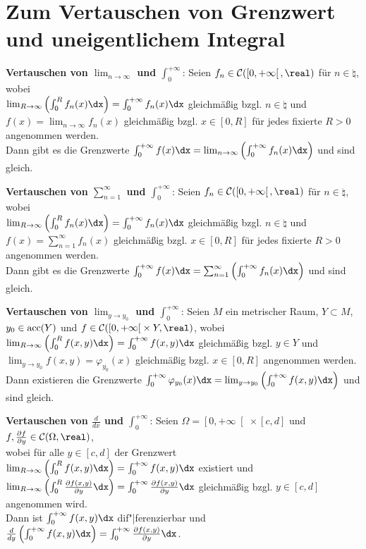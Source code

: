 \section{%
    Zum Vertauschen von Grenzwert und uneigentlichem Integral%
}

\textbf{Vertauschen von $\lim_{n \to \infty}$ und $\int_0^{+\infty}$}:
Seien $f_n \in \C(\left[0,+\infty\right[, \real)$ für $n \in \natural$,
wobei \\
$\lim_{R \to \infty} \left(\int_0^R f_n(x)\dx\right) =
\int_0^{+\infty} f_n(x)\dx$ gleichmäßig bzgl. $n \in \natural$ und \\
$f(x) = \lim_{n \to \infty} f_n(x)$ gleichmäßig bzgl. $x \in [0,R]$
für jedes fixierte $R > 0$ angenommen werden. \\
Dann gibt es die Grenzwerte
$\int_0^{+\infty} f(x)\dx =
\lim_{n \to \infty} \left(\int_0^{+\infty} f_n(x)\dx\right)$
und sind gleich.

\textbf{Vertauschen von $\sum_{n=1}^\infty$ und $\int_0^{+\infty}$}:
Seien $f_n \in \C(\left[0,+\infty\right[, \real)$ für $n \in \natural$,
wobei \\
$\lim_{R \to \infty} \left(\int_0^R f_n(x)\dx\right) =
\int_0^{+\infty} f_n(x)\dx$ gleichmäßig bzgl. $n \in \natural$ und \\
$f(x) = \sum_{n=1}^\infty f_n(x)$ gleichmäßig bzgl. $x \in [0,R]$
für jedes fixierte $R > 0$ angenommen werden. \\
Dann gibt es die Grenzwerte
$\int_0^{+\infty} f(x)\dx =
\sum_{n=1}^\infty \left(\int_0^{+\infty} f_n(x)\dx\right)$
und sind gleich.

\textbf{Vertauschen von $\lim_{y \to y_0}$ und $\int_0^{+\infty}$}:
Seien $M$ ein metrischer Raum, $Y \subset M$, $y_0 \in \operatorname{acc}(Y)$ und
$f \in \C(\left[0, +\infty\right[ \times Y, \real)$, wobei \\
$\lim_{R \to \infty} \left(\int_0^R f(x,y)\dx\right) =
\int_0^{+\infty} f(x,y)\dx$ gleichmäßig bzgl. $y \in Y$ und \\
$\lim_{y \to y_0} f(x,y) = \varphi_{y_0}(x)$ gleichmäßig bzgl. $x \in [0,R]$
angenommen werden. \\
Dann existieren die Grenzwerte
$\int_0^{+\infty} \varphi_{y_0}(x)\dx =
\lim_{y \to y_0} \left(\int_0^{+\infty} f(x,y)\dx\right)$ und sind gleich.

\linie

\textbf{Vertauschen von $\frac{d}{dx}$ und $\int_0^{+\infty}$}:
Seien $\Omega = \left[0, +\infty\right[ \times [c,d]$ und
$f, \frac{\partial f}{\partial y} \in \C(\Omega, \real)$, \\
wobei für alle $y \in [c,d]$ der Grenzwert
$\lim_{R \to \infty} \left(\int_0^R f(x,y)\dx\right) =
\int_0^{+\infty} f(x,y)\dx$ existiert und \\
$\lim_{R \to \infty}
\left(\int_0^R \frac{\partial f(x, y)}{\partial y}\dx\right) =
\int_0^{+\infty} \frac{\partial f(x,y)}{\partial y}\dx$ gleichmäßig
bzgl. $y \in [c,d]$ angenommen wird. \\
Dann ist $\int_0^{+\infty} f(x,y)\dx$ dif"|ferenzierbar und
$\frac{d}{dy} \left(\int_0^{+\infty} f(x,y)\dx\right) =
\int_0^{+\infty} \frac{\partial f(x,y)}{\partial y}\dx$.

